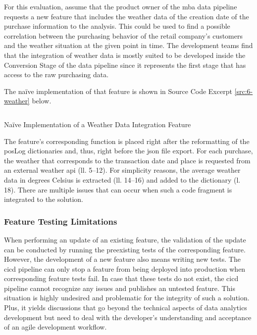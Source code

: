 For this evaluation, assume that the product owner of the \ac{mba} data pipeline requests a new feature that includes the weather data of the creation date of the purchase information to the analysis. This could be used to find a possible correlation between the purchasing behavior of the retail company's customers and the weather situation at the given point in time. The development teams find that the integration of weather data is mostly suited to be developed inside the Conversion Stage of the data pipeline since it represents the first stage that has access to the raw purchasing data.

The na\"ive implementation of that feature is shown in Source Code Excerpt \ref{src:6-weather} below.

\begin{listing}[h!]
	\inputminted{python}{main-matter/src/6-weather.py}
	\caption{Na\"ive Implementation of a Weather Data Integration Feature}
	\label{src:6-weather}
\end{listing}

The feature's corresponding function is placed right after the reformatting of the \ac{pos}Log dictionaries and, thus, right before the \ac{json} file export. For each purchase, the weather that corresponds to the transaction date and place is requested from an external weather \acs{api} (ll. 5--12). For simplicity reasons, the average weather data in degrees Celsius is extracted (ll. 14--16) and added to the dictionary (l. 18). There are multiple issues that can occur when such a code fragment is integrated to the solution. 

\subsubsection{Feature Testing Limitations}
When performing an update of an existing feature, the validation of the update can be conducted by running the preexisting tests of the corresponding feature. However, the development of a new feature also means writing new tests. The \ac{cicd} pipeline can only stop a feature from being deployed into production when corresponding feature tests fail. In case that these tests do not exist, the \ac{cicd} pipeline cannot recognize any issues and publishes an untested feature. This situation is highly undesired and problematic for the integrity of such a solution. Plus, it yields discussions that go beyond the technical aspects of data analytics development but need to deal with the developer's understanding and acceptance of an agile development workflow.

